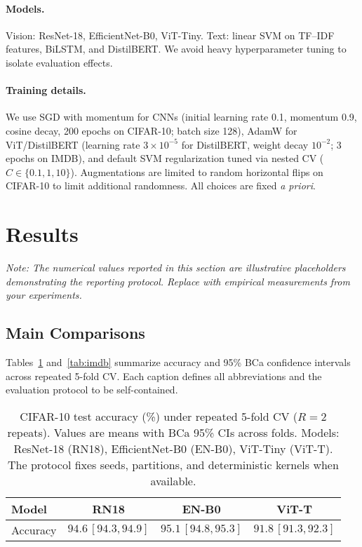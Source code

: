 \documentclass[11pt]{article}
\begin{document}
\paragraph{Models.} Vision: ResNet-18, EfficientNet-B0, ViT-Tiny. Text: linear SVM on TF--IDF features, BiLSTM, and DistilBERT. We avoid heavy hyperparameter tuning to isolate evaluation effects.

\paragraph{Training details.} We use SGD with momentum for CNNs (initial learning rate 0.1, momentum 0.9, cosine decay, 200 epochs on CIFAR-10; batch size 128), AdamW for ViT/DistilBERT (learning rate $3\times10^{-5}$ for DistilBERT, weight decay $10^{-2}$; 3 epochs on IMDB), and default SVM regularization tuned via nested CV ($C\in\{0.1, 1, 10\}$). Augmentations are limited to random horizontal flips on CIFAR-10 to limit additional randomness. All choices are fixed \emph{a priori}.

\section{Results}
\noindent\textit{Note: The numerical values reported in this section are illustrative placeholders demonstrating the reporting protocol. Replace with empirical measurements from your experiments.}
\subsection{Main Comparisons}
Tables~\ref{tab:cifar} and~\ref{tab:imdb} summarize accuracy and 95\% BCa confidence intervals across repeated 5-fold CV. Each caption defines all abbreviations and the evaluation protocol to be self-contained.

\begin{table}[t]
  \centering
  \small
  \caption{CIFAR-10 test accuracy (\%) under repeated 5-fold CV ($R=2$ repeats). Values are means with BCa 95\% CIs across folds. Models: ResNet-18 (RN18), EfficientNet-B0 (EN-B0), ViT-Tiny (ViT-T). The protocol fixes seeds, partitions, and deterministic kernels when available.}
  \label{tab:cifar}
  \begin{tabular}{lccc}
    \toprule
    Model & RN18 & EN-B0 & ViT-T \\
    \midrule
    Accuracy & $94.6\,[94.3,94.9]$ & $95.1\,[94.8,95.3]$ & $91.8\,[91.3,92.3]$ \\
    \bottomrule
  \end{tabular}
\end{table}
\end{document}
